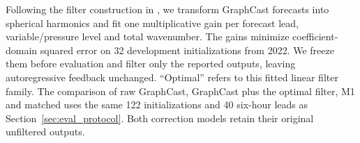 \documentclass{article}
\newcommand{\vfourchange}[1]{{\color{blue}#1}}
\newcommand{\vfourred}[1]{{\color{red}#1}}
\newif\ifvfivechanges
\newcommand{\vfiveidentity}[1]{#1}
\DeclareRobustCommand{\vfiveadded}[1]{\ifvfivechanges{\color{vfiveAdded}%
  \let\vfourchange\vfiveidentity\let\vfourred\vfiveidentity#1}\else{\color{blue}%
  \let\vfourchange\vfiveidentity\let\vfourred\vfiveidentity#1}\fi}
\DeclareRobustCommand{\vfiveRone}[1]{\ifvfivechanges{\color{vfiveDeleted}\sout{#1}}\,\fi\vfiveadded{R1}}
\begin{document}
\begin{figure}[!t]
    \label{fig:smoothing_spectra}
\end{figure}

\vfourred{Following the filter construction in \citet[Supplementary Section~7.4.2]{lam2023graphcast}, we transform GraphCast forecasts into spherical harmonics and fit one multiplicative gain per forecast lead, variable/pressure level and total wavenumber. The gains minimize coefficient-domain squared error on 32 development initializations from 2022. We freeze them before evaluation and filter only the reported outputs, leaving autoregressive feedback unchanged. ``Optimal'' refers to this fitted linear filter family. The comparison of raw GraphCast, GraphCast plus the optimal filter, M1 and matched \vfiveRone{reset/reset} uses the same 122 initializations and 40 six-hour leads as Section~\ref{sec:eval_protocol}. Both correction models retain their original unfiltered outputs.}
\end{document}
